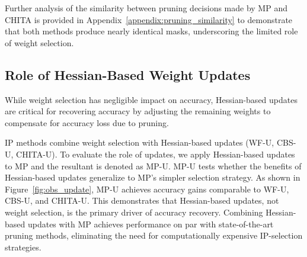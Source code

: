 Further analysis of the similarity between pruning decisions made by MP and CHITA is provided in Appendix~\ref{appendix:pruning_similarity} to demonstrate that both methods produce nearly identical masks, underscoring the limited role of weight selection.



\subsection{Role of Hessian-Based Weight Updates}

While weight selection has negligible impact on accuracy, Hessian-based updates are critical for recovering accuracy by adjusting the remaining weights to compensate for accuracy loss due to pruning.

IP methods combine weight selection with Hessian-based updates (WF-U, CBS-U, CHITA-U). To evaluate the role of updates, we apply Hessian-based updates to MP and the resultant is denoted as MP-U. MP-U tests whether the benefits of Hessian-based updates generalize to MP's simpler selection strategy.
As shown in Figure~\ref{fig:obs_update}, MP-U achieves accuracy gains comparable to WF-U, CBS-U, and CHITA-U. This demonstrates that Hessian-based updates, not weight selection, is the primary driver of accuracy recovery. Combining Hessian-based updates with MP achieves performance on par with state-of-the-art pruning methods, eliminating the need for computationally expensive IP-selection strategies.





